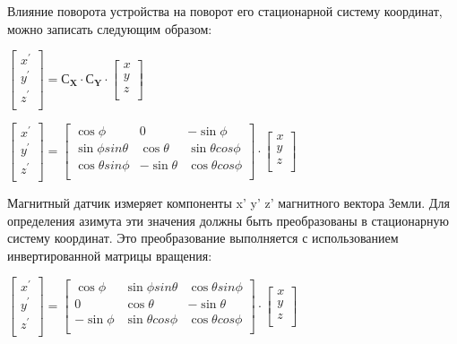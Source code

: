 Влияние поворота устройства на поворот его стационарной систему координат,
можно записать следующим образом:

$ \begin{bmatrix} x^' \\ y^' \\ z^' \\ \end{bmatrix} = 
\mathbf{С_X} \cdot \mathbf{С_Y} \cdot \begin{bmatrix} x \\ y \\ z \\ \end{bmatrix} $

$ \begin{bmatrix} x^' \\ y^' \\ z^' \\ \end{bmatrix} = 
\begin{bmatrix} \cos{\phi} & 0 & -\sin{\phi} \\ 
    \sin{\phi}sin{\theta} & \cos{\theta} & \sin{\theta}cos{\phi} \\ 
    \cos{\theta}sin{\phi} & -\sin{\theta} & \cos{\theta}cos{\phi} \\ 
\end{bmatrix}
\cdot
\begin{bmatrix} x \\ y \\ z \\ \end{bmatrix} $

Магнитный датчик измеряет компоненты x' y' z' магнитного вектора Земли. 
Для определения азимута эти значения должны быть преобразованы в стационарную систему координат.
Это преобразование выполняется с использованием инвертированной матрицы вращения:

$ \begin{bmatrix} x^' \\ y^' \\ z^' \\ \end{bmatrix} = 
\begin{bmatrix} \cos{\phi} & \sin{\phi}sin{\theta} & \cos{\theta}sin{\phi} \\ 
                0 & \cos{\theta} & -\sin{\theta} \\ 
                -\sin{\phi} & \sin{\theta}cos{\phi}& \cos{\theta}cos{\phi} \\ 
\end{bmatrix}
\cdot
\begin{bmatrix} x \\ y \\ z \\ \end{bmatrix} $


